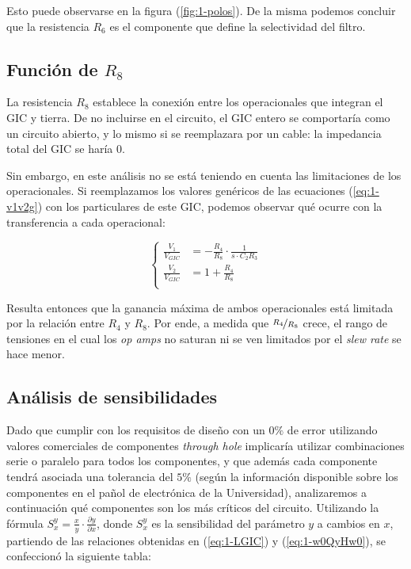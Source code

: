 \documentclass[../../tc_tp3_main.tex]{subfiles}
\begin{document}
Esto puede observarse en la figura (\ref{fig:1-polos}). De la misma podemos concluir que la resistencia $R_6$ es el componente que define la selectividad del filtro.


\subsection{Funci\'on de $R_8$}

La resistencia $R_8$ establece la conexi\'on entre los operacionales que integran el GIC y tierra. De no incluirse en el circuito, el GIC entero se comportar\'ia como un circuito abierto, y lo mismo si se reemplazara por un cable: la impedancia total del GIC se har\'ia 0. \par

Sin embargo, en este an\'alisis no se est\'a teniendo en cuenta las limitaciones de los operacionales. Si reemplazamos los valores gen\'ericos de las ecuaciones (\ref{eq:1-v1v2g}) con los particulares de este GIC, podemos observar qu\'e ocurre con la transferencia a cada operacional:

\begin{equation}
	\left\{
	 	\begin{aligned}
			\frac{V_1}{V_{GIC}} &= -\frac{R_4}{R_8} \cdot \frac{1}{s\cdot C_2 R_3}\\
			\frac{V_2}{V_{GIC}} &= 1+ \frac{R_4}{R_8} \\ 
		\end{aligned}
	\right.
	\label{eq:v1v2vgic}
 \end{equation}

Resulta entonces que la ganancia m\'axima de ambos operacionales est\'a limitada por la relaci\'on entre $R_4$ y $R_8$. Por ende, a medida que $\nicefrac{R_4}{R_8}$ crece, el rango de tensiones en el cual los \textit{op amps} no saturan ni se ven limitados por el \textit{slew rate} se hace menor. \par



\subsection{An\'alisis de sensibilidades}

Dado que cumplir con los requisitos de dise\~no con un $0\%$ de error utilizando valores comerciales de componentes \textit{through hole} implicar\'ia utilizar combinaciones serie o paralelo para todos los componentes, y que adem\'as cada componente tendr\'a asociada una tolerancia del $5\%$ (seg\'un la informaci\'on disponible sobre los componentes en el pa\~nol de electr\'onica de la Universidad), analizaremos a continuaci\'on qu\'e componentes son los m\'as cr\'iticos del circuito. Utilizando la f\'ormula $S_{x}^{y} = \frac{x}{y} \cdot  \frac{\partial y}{\partial x}$, donde $S_x^y$ es la sensibilidad del par\'ametro $y$ a cambios en $x$, partiendo de las relaciones obtenidas en (\ref{eq:1-LGIC}) y (\ref{eq:1-w0QyHw0}), se confeccion\'o la siguiente tabla:
\end{document}
